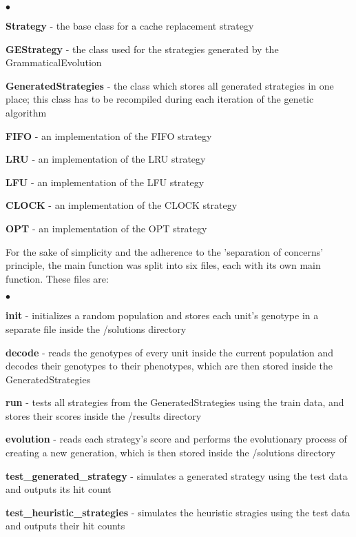 \begin{list}{$\bullet$}{}  	
	\item \textbf{Strategy} - the base class for a cache replacement strategy
	\item \textbf{GEStrategy} - the class used for the strategies generated by the GrammaticalEvolution
	\item \textbf{GeneratedStrategies} - the class which stores all generated strategies in one place; this class has to be recompiled during each iteration of the genetic algorithm
	\item \textbf{FIFO} - an implementation of the FIFO strategy
	\item \textbf{LRU} - an implementation of the LRU strategy
	\item \textbf{LFU} - an implementation of the LFU strategy
	\item \textbf{CLOCK} - an implementation of the CLOCK strategy
	\item \textbf{OPT} - an implementation of the OPT strategy
\end{list}

For the sake of simplicity and the adherence to the 'separation of concerns' principle, the main function was split into six files, each with its own main function. These files are:

\begin{list}{$\bullet$}{}  	
	\item \textbf{init} - initializes a random population and stores each unit's genotype in a separate file inside the /solutions directory
	\item \textbf{decode} - reads the genotypes of every unit inside the current population and decodes their genotypes to their phenotypes, which are then stored inside the GeneratedStrategies
	\item \textbf{run} - tests all strategies from the GeneratedStrategies using the train data, and stores their scores inside the /results directory
	\item \textbf{evolution} - reads each strategy's score and performs the evolutionary process of creating a new generation, which is then stored inside the /solutions directory
	\item \textbf{test\_generated\_strategy} - simulates a generated strategy using the test data and outputs its hit count
	\item \textbf{test\_heuristic\_strategies} - simulates the heuristic stragies using the test data and outputs their hit counts
\end{list}

